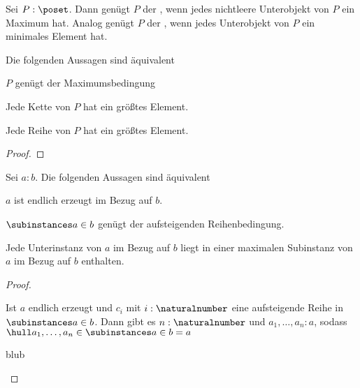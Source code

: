 \begin{definition}
    Sei $P:\poset$. Dann genügt $P$ der , wenn jedes nichtleere Unterobjekt von $P$ ein Maximum
    hat. Analog genügt $P$ der , wenn jedes Unterobjekt von $P$
    ein minimales Element hat.
\end{definition}

\begin{lemma}
    Die folgenden Aussagen sind äquivalent
    \begin{statements}
            \item $P$ genügt der Maximumsbedingung
            \item Jede Kette von $P$ hat ein größtes Element.
            \item Jede Reihe von $P$ hat ein größtes Element.
    \end{statements}
\end{lemma}

\begin{proof}
    
\end{proof}

\begin{theorem}
    Sei $a:b$. Die folgenden Aussagen sind äquivalent
    \begin{statements}
            \item $a$ ist endlich erzeugt im Bezug auf $b$.
            \item $\subinstances a\in b$ genügt der aufsteigenden Reihenbedingung.
            \item Jede Unterinstanz von $a$ im Bezug auf $b$ liegt in einer maximalen Subinstanz
        von $a$ im Bezug auf $b$ enthalten.
    \end{statements}
\end{theorem}%

\begin{proof}
    \begin{implications}
            \item Ist $a$ endlich erzeugt und $c_i$ mit $i:\naturalnumber$ eine
        aufsteigende Reihe in $\subinstances a\in
        b$. Dann gibt es $n:\naturalnumber$ und $a_1,\ldots,a_n:a$, sodass $\hull
        a_1,\ldots,a_n\in{\subinstances a\in b}=a$
            \item
        \item blub
    \end{implications}
\end{proof}%


